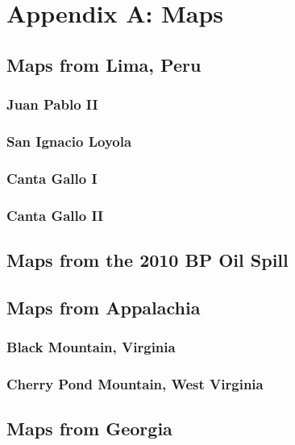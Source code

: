 \documentclass[11pt]{report}
\begin{document}
\chapter*{Appendix A: Maps}

\section{Maps from Lima, Peru}

\subsection{Juan Pablo II}

\subsection{San Ignacio Loyola}

\subsection{Canta Gallo I}

\subsection{Canta Gallo II}

\section{Maps from the 2010 BP Oil Spill}



\section{Maps from Appalachia}

\subsection{Black Mountain, Virginia}

\subsection{Cherry Pond Mountain, West Virginia}

\section{Maps from Georgia}
\end{document}
